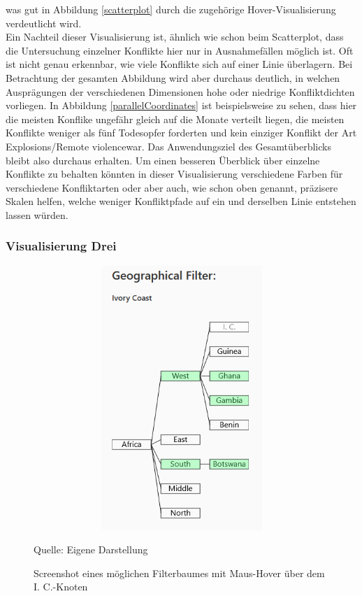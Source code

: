 \documentclass[usegeometry=true]{scrartcl}
\begin{document}
was gut in Abbildung \ref{scatterplot} durch die zugehörige Hover-Visualisierung verdeutlicht wird.\\ Ein Nachteil dieser Visualisierung ist, ähnlich wie schon beim Scatterplot, dass die Untersuchung einzelner Konflikte hier nur in Ausnahmefällen möglich ist. Oft ist nicht genau erkennbar, wie viele Konflikte sich auf einer Linie überlagern. Bei Betrachtung der gesamten Abbildung wird aber durchaus deutlich, in welchen Ausprägungen der verschiedenen Dimensionen hohe oder niedrige Konfliktdichten vorliegen. In Abbildung \ref{parallelCoordinates} ist beispielsweise zu sehen, dass hier die meisten Konflike ungefähr gleich auf die Monate verteilt liegen, die meisten Konflikte weniger als fünf Todesopfer forderten und kein einziger Konflikt der Art \glqq Explosions/Remote violence\grqq war. Das Anwendungsziel des Gesamtüberblicks bleibt also durchaus erhalten. Um einen besseren Überblick über einzelne Konflikte zu behalten könnten in dieser Visualisierung verschiedene Farben für verschiedene Konfliktarten oder aber auch, wie schon oben genannt, präzisere Skalen helfen, welche weniger Konfliktpfade auf ein und derselben Linie entstehen lassen würden.\\

\subsubsection{Visualisierung Drei}

\begin{figure}[]
\begin{center}
\includegraphics[width=12cm,height=10cm,keepaspectratio]{FilterTree.PNG}%
\caption{Screenshot eines möglichen Filterbaumes mit Maus-Hover über dem \glqq I. C.\grqq-Knoten}
Quelle: Eigene Darstellung
\label{filtertree}
\end{center}
\end{figure}
\end{document}
